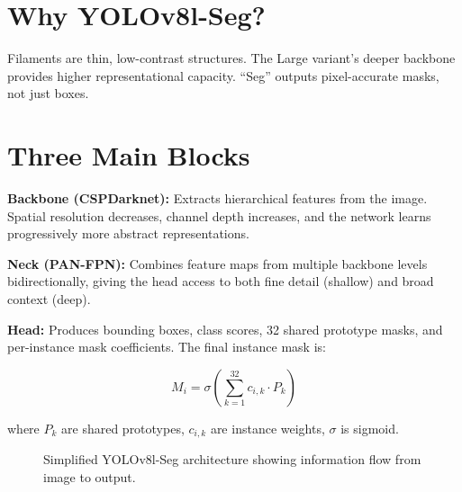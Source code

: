 \documentclass[12pt,a4paper,openany]{report}
\begin{document}
\section{Why YOLOv8l-Seg?}

Filaments are thin, low-contrast structures. The Large variant's deeper backbone provides
higher representational capacity. ``Seg'' outputs pixel-accurate masks, not just boxes.

\section{Three Main Blocks}

\textbf{Backbone (CSPDarknet):} Extracts hierarchical features from the image. Spatial
resolution decreases, channel depth increases, and the network learns progressively more
abstract representations.

\textbf{Neck (PAN-FPN):} Combines feature maps from multiple backbone levels bidirectionally,
giving the head access to both fine detail (shallow) and broad context (deep).

\textbf{Head:} Produces bounding boxes, class scores, 32 shared prototype masks, and
per-instance mask coefficients. The final instance mask is:

\begin{equation}
  M_i = \sigma\!\left(\sum_{k=1}^{32} c_{i,k} \cdot P_k\right)
  \label{eq:mask}
\end{equation}

where $P_k$ are shared prototypes, $c_{i,k}$ are instance weights, $\sigma$ is sigmoid.

\begin{figure}[H]
\centering
{}
\caption{Simplified YOLOv8l-Seg architecture showing information flow from image to output.}
\label{fig:arch}
\end{figure}
\end{document}
